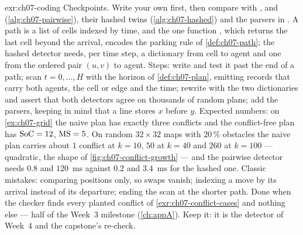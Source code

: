 
\begin{solution}{exr:ch07-coding}
Checkpoints. Write your own first, then compare with ,
 and  (\cref{alg:ch07-pairwise}), their hashed
twins (\cref{alg:ch07-hashed}) and the parsers in . A path is a list
of cells indexed by time, and the one function , which returns the
last cell beyond the arrival, encodes the parking rule of \cref{def:ch07-path}; the hashed
detector needs, per time step, a dictionary from cell to agent and one from the ordered
pair $(u,v)$ to agent. Steps: write  and test it past the end of a path;
scan $t=0,\dots,H$ with the horizon of \cref{def:ch07-plan}, emitting records that carry
both agents, the cell or edge and the time; rewrite with the two dictionaries and assert
that both detectors agree on thousands of random plans; add the parsers, keeping in mind
that a  line stores $x$ before $y$. Expected numbers: on \cref{ex:ch07-grid}
the naive plan has exactly three conflicts and the conflict-free plan has $\mathrm{SoC}=12$,
$\mathrm{MS}=5$. On random $32\times32$ maps with $20\,\%$ obstacles the naive plan carries
about $1$ conflict at $k=10$, $50$ at $k=40$ and $260$ at $k=100$ --- quadratic, the shape
of \cref{fig:ch07-conflict-growth} --- and the pairwise detector needs $0.8$ and $120$~ms
against $0.2$ and $3.4$~ms for the hashed one. Classic mistakes: comparing positions only,
so swaps vanish; indexing a move by its arrival instead of its departure; ending the scan
at the shorter path. Done when the checker finds every planted conflict of
\cref{exr:ch07-conflict-cases} and nothing else --- half of the Week~3 milestone
(\cref{ch:appA}). Keep it: it is the \cbs detector of Week~4 and the capstone's re-check.
\end{solution}


